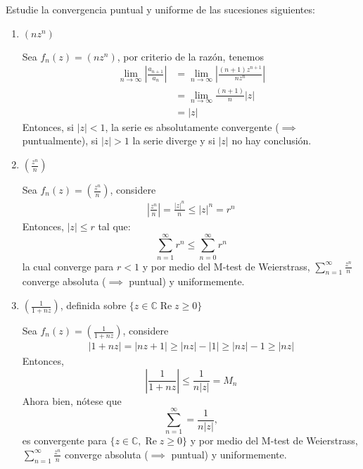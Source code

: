 





\begin{problema}[10p]
    Estudie la convergencia puntual y uniforme de las sucesiones siguientes:
    \begin{enumerate}
        \item $\left(n z^n\right)$
        \begin{sol}
            Sea $f_n(z)=(nz^n)$, por criterio de la razón, tenemos 
            \begin{align*}
                \lim_{n\to\infty}\left|\frac{a_{n+1}}{a_n}\right| &= \lim_{n\to\infty}\left|\frac{(n+1)z^{n+1}}{nz^n}\right|\\
                &= \lim_{n\to\infty}\frac{(n+1)}{n}|z|\\
                &= |z|
            \end{align*}
            Entonces, si $|z|<1$, la serie es absolutamente convergente ($\implies$ puntualmente), si $|z|>1$ la serie diverge y si $|z|$ no hay conclusión. 
            
        \end{sol}
        \item $\left(\frac{z^n}{n}\right)$
        \begin{sol}
            Sea $f_n(z)=\left(\frac{z^n}{n}\right)$, considere 
            \begin{align*}
                \left|\frac{z^n}{n}\right|=\frac{|z|^n}{n}\leq |z|^n=r^n
            \end{align*}
            Entonces, $|z|\leq r$ tal que:
            $$\sum_{n=1}^{\infty}r^n\leq \sum_{n=0}^\infty r^n$$
            la cual converge para $r<1$ y por medio del M-test de Weierstrass, $\sum_{n=1}^{\infty} \frac{z^n}{n}$ converge absoluta ($\implies$ puntual) y uniformemente. 
        \end{sol}
        \item $\left(\frac{1}{1+n z}\right)$, definida sobre $\{z \in \mathbb{C}\operatorname{Re} z \geq 0\}$
        \begin{sol}
            Sea $f_n(z)=\left(\frac{1}{1+n z}\right)$, considere
            \begin{align*}
                \left|1+nz\right|=|nz+1|\geq |nz|-|1|\geq |nz|-1 \geq   |nz|       
            \end{align*}
            Entonces, 
            $$\left|\frac{1}{1+nz}\right|\leq \frac{1}{n|z|}=M_n$$
            Ahora bien, nótese que 
            $$\sum_{n=1}^{\infty}=\frac{1}{n|z|},$$
            es convergente para $\{z\in \mathbb{C}, \operatorname{Re}z\geq 0\}$ y por medio del M-test de Weierstrass, $\sum_{n=1}^{\infty} \frac{z^n}{n}$ converge absoluta ($\implies$ puntual) y uniformemente. 
        \end{sol}
    \end{enumerate}
\end{problema}

